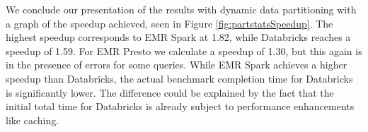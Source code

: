 We conclude our presentation of the results with dynamic data partitioning with a graph of the speedup achieved, seen in Figure \ref{fig:partstatsSpeedup}. The highest speedup corresponds to EMR Spark at 1.82, while Databricks reaches a speedup of 1.59. For EMR Presto we calculate a speedup of 1.30, but this again is in the presence of errors for some queries. While EMR Spark achieves a higher speedup than Databricks, the actual benchmark completion time for Databricks is significantly lower. The difference could be explained by the fact that the initial total time for Databricks is already subject to performance enhancements like caching.







